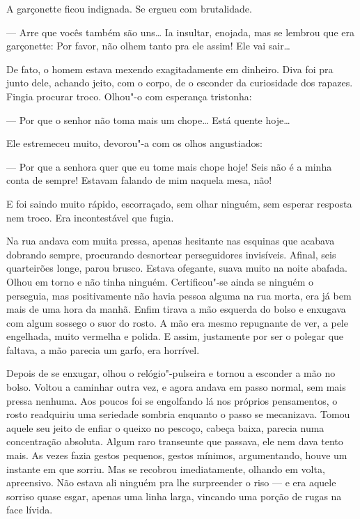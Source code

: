 \begin{linenumbers}
A garçonette ficou indignada. Se ergueu com brutalidade.

--- Arre que vocês também são uns\ldots{} Ia insultar, enojada, mas se
lembrou que era garçonette: Por favor, não olhem tanto pra ele assim!
Ele vai sair\ldots{}

De fato, o homem estava mexendo exagitadamente em dinheiro. Diva foi pra
junto dele, achando jeito, com o corpo, de o esconder da curiosidade dos
rapazes. Fingia procurar troco. Olhou"-o com esperança tristonha:

--- Por que o senhor não toma mais um chope\ldots{} Está quente hoje\ldots{}

Ele estremeceu muito, devorou"-a com os olhos angustiados:

--- Por que a senhora quer que eu tome mais chope hoje! Seis não é a
minha conta de sempre! Estavam falando de mim naquela mesa, não!

E foi saindo muito rápido, escorraçado, sem olhar ninguém, sem esperar
resposta nem troco. Era incontestável que fugia.

Na rua andava com muita pressa, apenas hesitante nas esquinas que
acabava dobrando sempre, procurando desnortear perseguidores invisíveis.
Afinal, seis quarteirões longe, parou brusco. Estava ofegante, suava
muito na noite abafada. Olhou em torno e não tinha ninguém.
Certificou"-se ainda se ninguém o perseguia, mas positivamente não havia
pessoa alguma na rua morta, era já bem mais de uma hora da manhã. Enfim
tirava a mão esquerda do bolso e enxugava com algum sossego o suor do
rosto. A mão era mesmo repugnante de ver, a pele engelhada, muito
vermelha e polida. E assim, justamente por ser o polegar que faltava, a
mão parecia um garfo, era horrível.

Depois de se enxugar, olhou o relógio"-pulseira e tornou a esconder a mão
no bolso. Voltou a caminhar outra vez, e agora andava em passo normal,
sem mais pressa nenhuma. Aos poucos foi se engolfando lá nos próprios
pensamentos, o rosto readquiriu uma seriedade sombria enquanto o passo
se mecanizava. Tomou aquele seu jeito de enfiar o queixo no pescoço,
cabeça baixa, parecia numa concentração absoluta. Algum raro transeunte
que passava, ele nem dava tento mais. As vezes fazia gestos pequenos,
gestos mínimos, argumentando, houve um instante em que sorriu. Mas se
recobrou imediatamente, olhando em volta, apreensivo. Não estava ali
ninguém pra lhe surpreender o riso --- e era aquele sorriso quase esgar,
apenas uma linha larga, vincando uma porção de rugas na face lívida.


\end{linenumbers}
